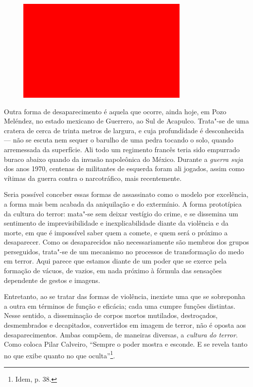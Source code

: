 \begin{figure}[!ht]
\centering
 \includegraphics[width=85mm]{./imgs/im1.jpg}
\caption{\footnotesize{}}
\end{figure}


Outra forma de desaparecimento é aquela que ocorre, ainda hoje, em Pozo
Meléndez, no estado mexicano de Guerrero, ao Sul de Acapulco. Trata"-se
de uma cratera de cerca de trinta metros de largura, e cuja profundidade
é desconhecida --- não se escuta nem sequer o barulho de uma pedra tocando
o solo, quando arremessada da superfície. Ali todo um regimento francês
teria sido empurrado buraco abaixo quando da invasão napoleônica do
México. Durante a \emph{guerra suja} dos anos 1970, centenas de
militantes de esquerda foram ali jogados, assim como vítimas da guerra
contra o narcotráfico, mais recentemente.

Seria possível conceber essas formas de assassinato como o modelo por
excelência, a forma mais bem acabada da aniquilação e do extermínio. A
forma prototípica da cultura do terror: mata"-se sem deixar vestígio do
crime, e se dissemina um sentimento de imprevisibilidade e
inexplicabilidade diante da violência e da morte, em que é impossível
saber quem a comete, e quem será o próximo a desaparecer. Como os
desaparecidos não necessariamente são membros dos grupos perseguidos,
trata"-se de um mecanismo no processos de transformação do medo em
terror. Aqui parece que estamos diante de um poder que se exerce pela
formação de vácuos, de vazios, em nada próximo à fórmula das sensações
dependente de gestos e imagens.

Entretanto, ao se tratar das formas de violência, inexiste uma que se
sobreponha a outra em términos de função e eficácia; cada uma cumpre
funções distintas. Nesse sentido, a disseminação de corpos mortos
mutilados, destroçados, desmembrados e decapitados, convertidos em
imagem de terror, não é oposta aos desaparecimentos. Ambas compõem, de
maneiras diversas, a \emph{cultura do terror}. Como coloca Pilar
Calveiro, ``Sempre o poder mostra e esconde. E se revela tanto no que
exibe quanto no que oculta''\footnote{Idem, p. 38.}.

